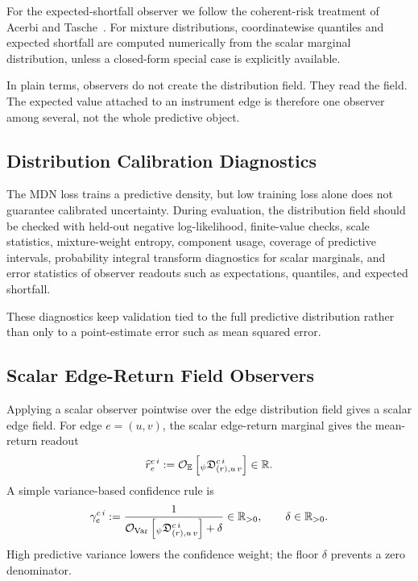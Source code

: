 For the expected-shortfall observer we follow the coherent-risk treatment of
Acerbi and Tasche~\cite{acerbi2002coherence}.  For mixture distributions,
coordinatewise quantiles and expected shortfall are computed numerically from
the scalar marginal distribution, unless a closed-form special case is
explicitly available.

In plain terms, observers do not create the distribution field.  They read the
field.  The expected value attached to an instrument edge is therefore one
observer among several, not the whole predictive object.

\subsection{Distribution Calibration Diagnostics}
\label{subsec:distribution-calibration-diagnostics}

The MDN loss trains a predictive density, but low training loss alone does not
guarantee calibrated uncertainty.  During evaluation, the distribution field
should be checked with held-out negative log-likelihood, finite-value checks,
scale statistics, mixture-weight entropy, component usage, coverage of
predictive intervals, probability integral transform diagnostics for scalar
marginals, and error statistics of observer readouts such as expectations,
quantiles, and expected shortfall.

These diagnostics keep validation tied to the full predictive distribution
rather than only to a point-estimate error such as mean squared error.

\subsection{Scalar Edge-Return Field Observers}
\label{subsec:scalar-edge-return-field-observers}

Applying a scalar observer pointwise over the edge distribution field gives a
scalar edge field.  For edge $e=(u,v)$, the scalar edge-return marginal gives
the mean-return readout
\[
  \widehat{r}_{e}^{c\,i}
  :=
  \mathcal{O}_{\mathbb{E}}
  \left[
    {}_{\psi}\mathfrak{D}_{(r),u\,v}^{c\,i}
  \right]
  \in\mathbb{R}.
\]
A simple variance-based confidence rule is
\[
  \gamma_{e}^{c\,i}
  :=
  \frac{1}{
    \mathcal{O}_{\operatorname{Var}}
    \left[
      {}_{\psi}\mathfrak{D}_{(r),u\,v}^{c\,i}
    \right]
    +
    \delta
  }
  \in\mathbb{R}_{>0},
  \qquad
  \delta\in\mathbb{R}_{>0}.
\]
High predictive variance lowers the confidence weight; the floor $\delta$
prevents a zero denominator.


